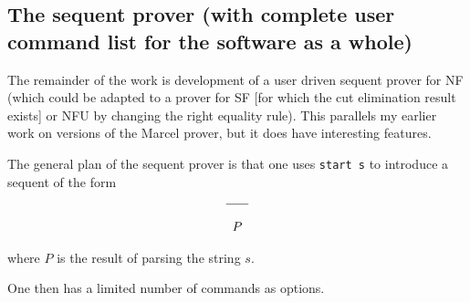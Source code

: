 \documentclass{article}
\begin{document}
 \subsection{The sequent prover (with complete user command list for the software as a whole)}
 
 The remainder of the work is development of a user driven sequent prover for NF (which could be adapted to a prover for SF [for which the cut elimination result exists] or NFU by changing the right equality rule).  This parallels my earlier work on versions of the Marcel prover, but it does have interesting features.

The general plan of the sequent prover is that one uses {\tt start s}  to introduce a sequent of the form

$$\begin{array}{c}
\hline \\
P
\end{array}$$

where $P$ is the result of parsing the string $s$.

One then has a limited number of commands as options.
\end{document}
